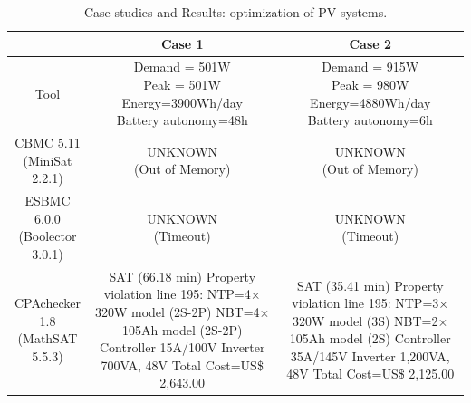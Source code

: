 \documentclass[10pt,conference]{IEEEtran}
\begin{document}
\begin{table}
\caption{Case studies and Results: optimization of PV systems.}\label{tab1}
\begin{scriptsize}
\begin{tabular}{|c|c|c|}
\hline
\hline
 & Case 1 & Case 2\\
\hline
\hline
Tool & \makecell{Demand = 501W \\ Peak = 501W \\ Energy=3900Wh/day \\ Battery autonomy=48h} & \makecell{Demand = 915W \\ Peak = 980W \\ Energy=4880Wh/day \\ Battery autonomy=6h}\\
\hline
\makecell{CBMC 5.11 \\(MiniSat 2.2.1)} & \makecell{UNKNOWN \\(Out of Memory)} & \makecell{UNKNOWN \\(Out of Memory)}\\
\hline
\makecell{ESBMC 6.0.0 \\(Boolector 3.0.1)} & \makecell{UNKNOWN \\(Timeout)} & \makecell{UNKNOWN \\(Timeout)} \\
\hline
\makecell{CPAchecker 1.8 \\(MathSAT 5.5.3)} & \makecell{SAT (66.18 min) \\ Property violation line 195: \\NTP=4$\times$320W model (2S-2P)\\NBT=4$\times$105Ah model (2S-2P)\\ Controller 15A/100V\\Inverter 700VA, 48V \\ Total Cost=US\$ 2,643.00} & \makecell {SAT (35.41 min) \\ Property violation line 195:  \\NTP=3$\times$320W model (3S)\\NBT=2$\times$105Ah model (2S)\\ Controller 35A/145V \\ Inverter 1,200VA, 48V \\ Total Cost=US\$ 2,125.00}\\
\hline
\hline
\end{tabular}
\end{scriptsize}
\end{table}
\end{document}

